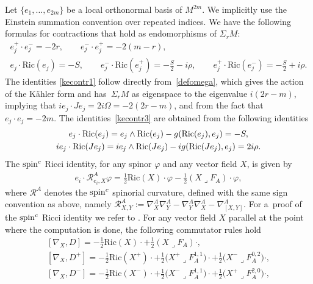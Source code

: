\documentclass[pdftex]{sigma}
\numberwithin{equation}{section}
\theoremstyle{definition}
\begin{document}
Let $\{e_1,\dots, e_{2m}\}$ be  a local orthonormal basis of $M^{2m}$. We implicitly use the Einstein summation convention over repeated indices. We have the  following formulas for contractions that
hold as endomorphisms of $\Sigma_r M$:
\begin{gather}\label{kecontr1}
e_j^+\cdot e_j^-=-2r, \qquad e_j^-\cdot e_j^+=-2(m-r),
\\
\label{kecontr3}
e_j\cdot \mathrm{Ric}(e_j)=-S, \qquad e_j^-\cdot \mathrm{Ric}(e_j^+)=-\frac{S}{2}-i\rho, \qquad e_j^+\cdot \mathrm{Ric}(e_j^-)=-\frac{S}{2}+i\rho.
\end{gather}
The  identities \eqref{kecontr1} follow directly from~\eqref{defomega}, which gives the action of the K\"ahler form and has~$\Sigma_r M $ as eigenspace to the eigenvalue $i(2r-m)$, implying that $ie_j\cdot Je_j=2i\Omega=-2(2r-m)$, and from the fact that $e_j\cdot e_j=-2m$. The identities~\eqref{kecontr3} are obtained from the following identities
\begin{gather*}
e_j\cdot {\mathop{\rm Ric}}(e_j)=e_j\wedge {\mathop{\rm Ric}}(e_j)-g({\mathop{\rm Ric}}(e_j),e_j)=-S,\\
 ie_j\cdot {\mathop{\rm Ric}}(Je_j)=ie_j\wedge {\mathop{\rm Ric}}(Je_j)-ig({\mathop{\rm Ric}}(Je_j),e_j)=2i\rho.
\end{gather*}
The ${\mathop{\rm spin}^c}$ Ricci identity, for any spinor $\varphi$ and any vector f\/ield $X$, is given by
\begin{gather}\label{ricident}
e_i \cdot\mathcal{R}^A_{e_i,X} \varphi= \frac{1}{2}\mathrm{Ric}(X) \cdot\varphi-\frac{1}{2} (X\lrcorner F_A)\cdot\varphi,
\end{gather}
where $\mathcal{R}^A$ denotes the ${\mathop{\rm spin}^c}$ spinorial curvature, def\/ined with the same sign convention as above, namely $\mathcal{R}^A_{X,Y}:=\nabla^A_{X}\nabla^A_{Y}
-\nabla^A_{Y}\nabla^A_{X}-\nabla^A_{[X,Y]}$. For a~proof of the ${\mathop{\rm spin}^c}$ Ricci identity we refer to \cite[Section~3.1]{fr_book}.
For any vector f\/ield $X$ parallel at the point where the computation is done, the following commutator rules hold
 \begin{gather}\label{nablax}
[\nabla_X,D]=-\frac{1}{2}\mathrm{Ric}(X)\cdot+\frac{1}{2}(X\lrcorner F_A)\cdot,
\\\label{nablax+}
[\nabla_{X},D^+]=-\frac{1}{2}\mathrm{Ric}(X^+)\cdot+\frac{1}{2}\big(X^+\lrcorner F^{1,1}_A\big)\cdot +\frac{1}{2}\big(X^-\lrcorner F_A^{0,2}\big)\cdot,
\\
\label{nablax-}
[\nabla_{X},D^-]=-\frac{1}{2}\mathrm{Ric}(X^-)\cdot+\frac{1}{2}\big(X^-\lrcorner F^{1,1}_A\big)\cdot+\frac{1}{2}\big(X^+\lrcorner F_A^{2,0}\big)\cdot,
\end{gather}
\end{document}
